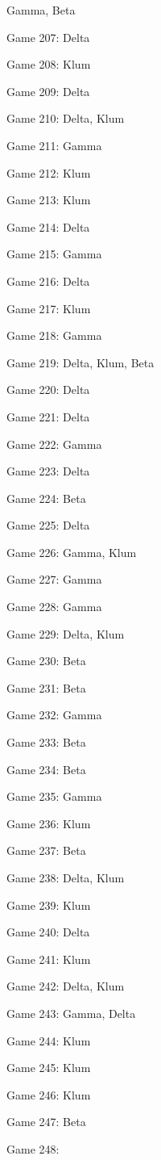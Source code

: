 \documentclass{article}
\begin{document}
\begin{multicols}{3}
\begin{compactitem}
Gamma, Beta
\item Game 207:
Delta
\item Game 208:
Klum
\item Game 209:
Delta
\item Game 210:
Delta, Klum
\item Game 211:
Gamma
\item Game 212:
Klum
\item Game 213:
Klum
\item Game 214:
Delta
\item Game 215:
Gamma
\item Game 216:
Delta
\item Game 217:
Klum
\item Game 218:
Gamma
\item Game 219:
Delta, Klum, Beta
\item Game 220:
Delta
\item Game 221:
Delta
\item Game 222:
Gamma
\item Game 223:
Delta
\item Game 224:
Beta
\item Game 225:
Delta
\item Game 226:
Gamma, Klum
\item Game 227:
Gamma
\item Game 228:
Gamma
\item Game 229:
Delta, Klum
\item Game 230:
Beta
\item Game 231:
Beta
\item Game 232:
Gamma
\item Game 233:
Beta
\item Game 234:
Beta
\item Game 235:
Gamma
\item Game 236:
Klum
\item Game 237:
Beta
\item Game 238:
Delta, Klum
\item Game 239:
Klum
\item Game 240:
Delta
\item Game 241:
Klum
\item Game 242:
Delta, Klum
\item Game 243:
Gamma, Delta
\item Game 244:
Klum
\item Game 245:
Klum
\item Game 246:
Klum
\item Game 247:
Beta
\item Game 248:

\end{compactitem}
\end{multicols}
\end{document}
